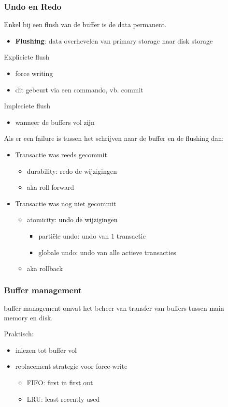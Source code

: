 \documentclass[a4paper,12pt]{article}
\begin{document}
\subsubsection{Undo en Redo}
Enkel bij een flush van de buffer is de data permanent.
\begin{itemize}
\item \textbf{Flushing}: data overhevelen van primary storage naar disk storage
\end{itemize}
Expliciete flush
\begin{itemize}
\item force writing
\item dit gebeurt via een commando, vb. commit
\end{itemize}
Impleciete flush
\begin{itemize}
\item wanneer de buffers vol zijn
\end{itemize}
Als er een failure is tussen het schrijven naar de buffer en de flushing dan:
\begin{itemize}
\item Transactie was reeds gecommit
	\begin{itemize}
	\item durability: redo de wijzigingen
	\item aka roll forward
	\end{itemize}
\item Transactie was nog niet gecommit
	\begin{itemize}
	\item atomicity: undo de wijzigingen
		\begin{itemize}
		\item partiële undo: undo van 1 transactie
		\item globale undo: undo van alle actieve transacties
		\end{itemize}
	\item aka rollback
	\end{itemize}
\end{itemize}
\subsubsection{Buffer management}
buffer management omvat het beheer van transfer van buffers tussen main memory en disk.

Praktisch:
\begin{itemize}
\item inlezen tot buffer vol
\item replacement strategie voor force-write
	\begin{itemize}
	\item FIFO: first in first out
	\item LRU: least recently used
	\end{itemize}
\end{itemize}
\end{document}
